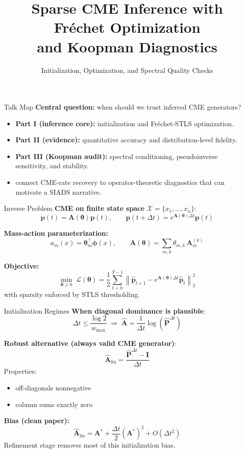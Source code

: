 \documentclass[10pt,aspectratio=169]{beamer}
\title[CME Inference + Koopman]{Sparse CME Inference with Fr\'{e}chet Optimization\\and Koopman Diagnostics}
\subtitle{Initialization, Optimization, and Spectral Quality Checks}
\author{}
\date{}
\newcommand{\calX}{\mathcal{X}}
\newcommand{\bA}{\mathbf{A}}
\newcommand{\bP}{\mathbf{P}}
\newcommand{\bI}{\mathbf{I}}
\newcommand{\bp}{\mathbf{p}}
\newcommand{\btheta}{\bm{\theta}}
\newcommand{\bphi}{\bm{\phi}}
\newcommand{\cL}{\mathcal{L}}
\begin{document}
\begin{frame}
\titlepage
\end{frame}

\begin{frame}{Talk Map}
\textbf{Central question:} when should we trust inferred CME generators?
\begin{itemize}
    \item \textbf{Part I (inference core):} initialization and Fr\'{e}chet-STLS optimization.
    \item \textbf{Part II (evidence):} quantitative accuracy and distribution-level fidelity.
    \item \textbf{Part III (Koopman audit):} spectral conditioning, pseudoinverse sensitivity, and stability.
\end{itemize}

\vspace{0.4em}
\begin{itemize}
    \item connect CME-rate recovery to operator-theoretic diagnostics that can motivate a SIADS narrative.
\end{itemize}
\end{frame}

\begin{frame}{Inverse Problem}
\textbf{CME on finite state space} $\calX=\{x_1,\ldots,x_n\}$:
\[
\dot{\bp}(t)=\bA(\btheta)\bp(t),\qquad \bp(t+\Delta t)=e^{\bA(\btheta)\Delta t}\bp(t)
\]

\vspace{0.3em}
\textbf{Mass-action parameterization:}
\[
a_m(x)=\btheta_m^\top \bphi(x),\qquad
\bA(\btheta)=\sum_{m,k}\theta_{m,k}\,\bA_m^{(k)}
\]

\vspace{0.3em}
\textbf{Objective:}
\[
\min_{\btheta\ge 0}\; \cL(\btheta)=\frac12\sum_{t=0}^{T-1}
\left\|\hat{\bp}_{t+1}-e^{\bA(\btheta)\Delta t}\hat{\bp}_{t}\right\|_2^2
\]
with sparsity enforced by STLS thresholding.
\end{frame}

\begin{frame}{Initialization Regimes}
\textbf{When diagonal dominance is plausible}:
\[
\Delta t \le \frac{\log 2}{w_{\max}}\;\Rightarrow\;
\hat{\bA}=\frac{1}{\Delta t}\log\!\left(\hat{\bP}^{\Delta t}\right)
\]

\vspace{0.4em}
\textbf{Robust alternative (always valid CME generator)}:
\[
\hat{\bA}_{\text{lin}}=\frac{\hat{\bP}^{\Delta t}-\bI}{\Delta t}
\]
Properties:
\begin{itemize}
    \item off-diagonals nonnegative
    \item column sums exactly zero
\end{itemize}

\vspace{0.3em}
\textbf{Bias (clean paper):}
\[
\hat{\bA}_{\text{lin}}=\bA^*+\frac{\Delta t}{2}(\bA^*)^2+O(\Delta t^2)
\]
Refinement stage removes most of this initialization bias.
\end{frame}
\end{document}
